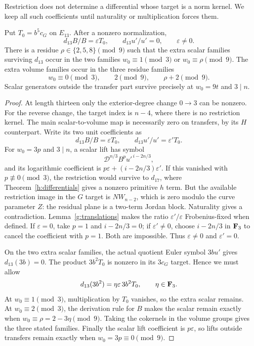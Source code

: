 Restriction does not determine a differential whose target is a norm
kernel.  We keep all such coefficients until naturality or
multiplication forces them.

\begin{lemma}\label{g:d13}
Put $T_0=b^5c_G$ on $E_{13}$.  After a nonzero normalization,
\[
 d_{13}B/B=\varepsilon T_0,\qquad
 d_{13}u'/u'=0,\qquad \varepsilon\ne0.
\]
There is a residue $\rho\in\{2,5,8\}\pmod9$ such that the extra
scalar families surviving $d_{13}$ occur in the two families
$w_0\equiv1\pmod3$ or $w_0\equiv\rho\pmod9$.
The extra volume families occur in the three residue families
\[
 w_0\equiv0\pmod3,\qquad 2\pmod9,
 \qquad \rho+2\pmod9.
\]
Scalar generators outside the transfer part survive precisely at
$w_0=9t$ and $3\mid n$.
\end{lemma}

\begin{proof}
At length thirteen only the exterior-degree change $0\to3$ can
be nonzero.  For the reverse change, the target index is $n-4$,
where there is no restriction kernel.  The main scalar-to-volume
map is necessarily zero on transfers, by its $H$ counterpart.
Write its two unit coefficients as
\[
 d_{13}B/B=\varepsilon T_0,\qquad
 d_{13}u'/u'=\varepsilon'T_0.
\]
For $w_0=3p$ and $3\mid n$, a scalar lift has symbol
\[
 \mathcal D^{n/3}B^pu'^{\,i-2n/3},
\]
and its logarithmic coefficient is
$p\varepsilon+(i-2n/3)\varepsilon'$.  If this vanished with
$p\not\equiv0\pmod3$, the restriction would survive to
$d_{17}$, where Theorem~\ref{h:differentials} gives a nonzero
primitive $h$ term.  But the available restriction image in the
$G$ target is $NW_{n-2}$, which is zero modulo the curve
parameter $Z$: the residual plane is a two-term Jordan block.
Naturality gives a contradiction.  Lemma~\ref{g:translations}
makes the ratio $\varepsilon'/\varepsilon$ Frobenius-fixed when
defined.  If $\varepsilon=0$, take $p=1$ and $i-2n/3=0$;
if $\varepsilon'\ne0$, choose $i-2n/3$ in $\mathbf F_3$ to cancel
the coefficient with $p=1$.  Both are impossible.  Thus
$\varepsilon\ne0$ and $\varepsilon'=0$.

On the two extra scalar families, the actual quotient Euler
symbol $3bu'$ gives $d_{13}(3b)=0$.  The product
$3b^2T_0$ is nonzero in its $3c_G$ target.  Hence we must
allow
\[
 d_{13}(3b^2)=\eta\varepsilon\,3b^2T_0,
 \qquad \eta\in\mathbf F_3.
\]
At $w_0\equiv1\pmod3$, multiplication by $T_0$ vanishes,
so the extra scalar remains.  At $w_0\equiv2\pmod3$,
the derivation rule for $B$ makes the scalar remain exactly
when $w_0\equiv\rho=2-3\eta\pmod9$.  Taking the
cokernels in the volume groups gives the three stated
families.  Finally the scalar lift coefficient is
$p\varepsilon$, so lifts outside transfers remain exactly
when $w_0=3p\equiv0\pmod9$.
\end{proof}

